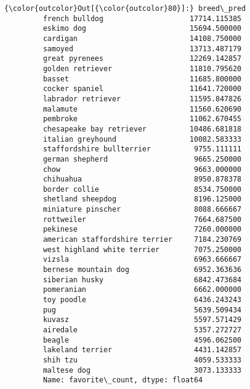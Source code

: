 \documentclass[11pt]{article}
\begin{document}
\begin{Verbatim}[commandchars=\\\{\}]
{\color{outcolor}Out[{\color{outcolor}80}]:} breed\_pred
         french bulldog                    17714.115385
         eskimo dog                        15694.500000
         cardigan                          14108.750000
         samoyed                           13713.487179
         great pyrenees                    12269.142857
         golden retriever                  11810.795620
         basset                            11685.800000
         cocker spaniel                    11641.720000
         labrador retriever                11595.847826
         malamute                          11560.620690
         pembroke                          11062.670455
         chesapeake bay retriever          10486.681818
         italian greyhound                 10082.583333
         staffordshire bullterrier          9755.111111
         german shepherd                    9665.250000
         chow                               9663.000000
         chihuahua                          8950.878378
         border collie                      8534.750000
         shetland sheepdog                  8196.125000
         miniature pinscher                 8088.666667
         rottweiler                         7664.687500
         pekinese                           7260.000000
         american staffordshire terrier     7184.230769
         west highland white terrier        7075.250000
         vizsla                             6963.666667
         bernese mountain dog               6952.363636
         siberian husky                     6842.473684
         pomeranian                         6662.000000
         toy poodle                         6436.243243
         pug                                5639.509434
         kuvasz                             5597.571429
         airedale                           5357.272727
         beagle                             4596.062500
         lakeland terrier                   4431.142857
         shih tzu                           4059.533333
         maltese dog                        3073.133333
         Name: favorite\_count, dtype: float64
\end{Verbatim}
            
\end{document}

